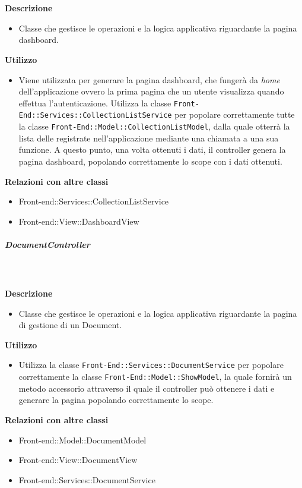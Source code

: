 				\textbf{\\ \\ Descrizione} 
					\begin{itemize}
						\item[] Classe che gestisce le operazioni e la logica applicativa riguardante la pagina dashboard.
					\end{itemize}      
				\textbf{Utilizzo}  
					\begin{itemize}
						\item[] Viene utilizzata per generare la pagina dashboard, che fungerà da \textit{home} dell'applicazione ovvero la prima pagina che un utente visualizza quando effettua l'autenticazione. Utilizza la classe \texttt{Front-End::Services::CollectionListService} per popolare correttamente tutte la classe \texttt{Front-End::Model::CollectionListModel}, dalla quale otterrà la lista delle  registrate nell'applicazione mediante una chiamata a una sua funzione. A questo punto, una volta ottenuti i dati, il controller genera la pagina dashboard, popolando correttamente lo scope con i dati ottenuti.
					\end{itemize}
					\textbf{Relazioni con altre classi}
					\begin{itemize}
							\item{Front-end::Services::CollectionListService}
							\item{Front-end::View::DashboardView}
					\end{itemize}
			\subparagraph{DocumentController}
				
				\textbf{\\ \\ Descrizione} 
					\begin{itemize}
						\item[] Classe che gestisce le operazioni e la logica applicativa riguardante la pagina di gestione di un Document.
					\end{itemize}      
				\textbf{Utilizzo}  
					\begin{itemize}
						\item[] Utilizza la classe \texttt{Front-End::Services::DocumentService} per popolare correttamente la classe \texttt{Front-End::Model::ShowModel}, la quale fornirà un metodo accessorio attraverso il quale il controller può ottenere i dati e generare la pagina popolando correttamente lo scope.
					\end{itemize}
					\textbf{Relazioni con altre classi}
					\begin{itemize}
							\item{Front-end::Model::DocumentModel}
							\item{Front-end::View::DocumentView}
							\item{Front-end::Services::DocumentService}
					\end{itemize}
